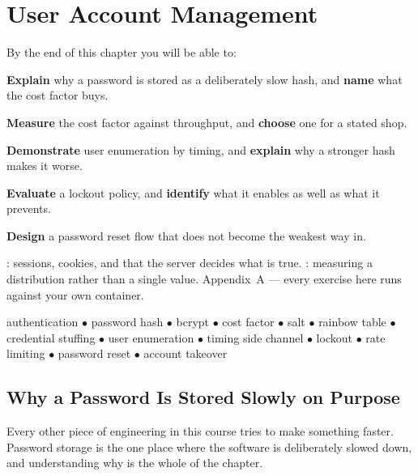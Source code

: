 \chapter{User Account Management}\label{ch:accounts}

\begin{outcomes}
By the end of this chapter you will be able to:
\begin{tight}
  \item \textbf{Explain} why a password is stored as a deliberately slow hash,
        and \textbf{name} what the cost factor buys.
  \item \textbf{Measure} the cost factor against throughput, and
        \textbf{choose} one for a stated shop.
  \item \textbf{Demonstrate} user enumeration by timing, and \textbf{explain}
        why a stronger hash makes it worse.
  \item \textbf{Evaluate} a lockout policy, and \textbf{identify} what it
        enables as well as what it prevents.
  \item \textbf{Design} a password reset flow that does not become the weakest
        way in.
\end{tight}
\end{outcomes}

\begin{prereq}
: sessions, cookies, and that the server decides what is true.
: measuring a distribution rather than a single value. Appendix~A
--- every exercise here runs against your own container.
\end{prereq}

\begin{keyterms}
authentication $\bullet$ password hash $\bullet$ bcrypt $\bullet$ cost factor
$\bullet$ salt $\bullet$ rainbow table $\bullet$ credential stuffing $\bullet$
user enumeration $\bullet$ timing side channel $\bullet$ lockout $\bullet$
rate limiting $\bullet$ password reset $\bullet$ account takeover
\end{keyterms}

\section{Why a Password Is Stored Slowly on Purpose}

Every other piece of engineering in this course tries to make something faster.
Password storage is the one place where the software is deliberately slowed
down, and understanding why is the whole of the chapter.

